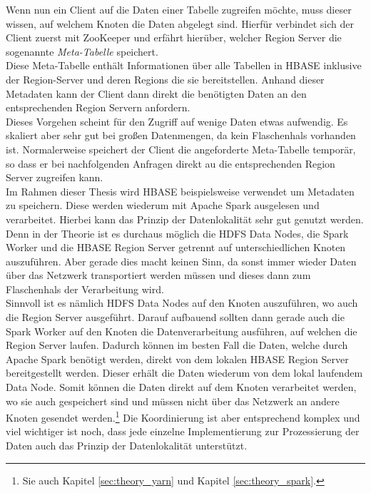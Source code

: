\noindent
Wenn nun ein Client auf die Daten einer Tabelle zugreifen möchte, muss dieser wissen, auf welchem Knoten die Daten abgelegt sind. Hierfür verbindet sich der Client zuerst mit ZooKeeper und erfährt hierüber, welcher Region Server die sogenannte \textit{Meta-Tabelle} speichert.\cite[S. 579]{hadoop_definitive_guide}\\
Diese Meta-Tabelle enthält Informationen über alle Tabellen in HBASE inklusive der Region-Server und deren Regions die sie bereitstellen. Anhand dieser Metadaten kann der Client dann direkt die benötigten Daten an den entsprechenden Region Servern anfordern.\\
Dieses Vorgehen scheint für den Zugriff auf wenige Daten etwas aufwendig. Es skaliert aber sehr gut bei großen Datenmengen, da kein Flaschenhals vorhanden ist. Normalerweise speichert der Client die angeforderte Meta-Tabelle temporär, so dass er bei nachfolgenden Anfragen direkt au die entsprechenden Region Server zugreifen kann.\\ 

\noindent
Im Rahmen dieser Thesis wird HBASE beispielsweise verwendet um Metadaten zu speichern. Diese werden wiederum mit Apache Spark ausgelesen und verarbeitet. Hierbei kann das Prinzip der Datenlokalität sehr gut genutzt werden. Denn in der Theorie ist es durchaus möglich die HDFS Data Nodes, die Spark Worker und die HBASE Region Server getrennt auf unterschiedlichen Knoten auszuführen. Aber gerade dies macht keinen Sinn, da sonst immer wieder Daten über das Netzwerk transportiert werden müssen und dieses dann zum Flaschenhals der Verarbeitung wird.\\
Sinnvoll ist es nämlich HDFS Data Nodes auf den Knoten auszuführen, wo auch die Region Server ausgeführt. Darauf aufbauend sollten dann gerade auch die Spark Worker auf den Knoten die Datenverarbeitung ausführen, auf welchen die Region Server laufen. Dadurch können im besten Fall die Daten, welche durch Apache Spark benötigt werden, direkt von dem lokalen HBASE Region Server bereitgestellt werden. Dieser erhält die Daten wiederum von dem lokal laufendem Data Node. Somit können die Daten direkt auf dem Knoten verarbeitet werden, wo sie auch gespeichert sind und müssen nicht über das Netzwerk an andere Knoten gesendet werden.\footnote{Sie auch Kapitel \ref{sec:theory_yarn} und Kapitel \ref{sec:theory_spark}.} Die Koordinierung ist aber entsprechend komplex und viel wichtiger ist noch, dass jede einzelne Implementierung zur Prozessierung der Daten auch das Prinzip der Datenlokalität unterstützt.\\

